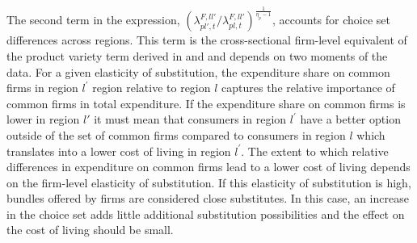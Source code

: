 The second term in the expression, $\left(\lambda^{F,ll'}_{pl',t}\bigg /\lambda^{F,ll'}_{pl,t}\right)^{\frac{1}{\eta_p-1}}$, accounts for choice set differences across regions. This term is the cross-sectional firm-level equivalent of the product variety term derived in \citet{Feenstra1994} and \citet{Broda2006} and depends on two moments of the data. For a given elasticity of substitution, the expenditure share on common firms in region $l^{'}$ region relative to region $l$ captures the relative importance of common firms in total expenditure. If the expenditure share on common firms is lower in region $l'$ it must mean that consumers in region $l^{'}$ have a better option outside of the set of common firms compared to consumers in region $l$ which translates into a lower cost of living in region $l^{'}$. The extent to which relative differences in expenditure on common firms lead to a lower cost of living depends on the firm-level elasticity of substitution. If this elasticity of substitution is high, bundles offered by firms are considered close substitutes. In this case, an increase in the choice set adds little additional substitution possibilities and the effect on the cost of living should be small.

